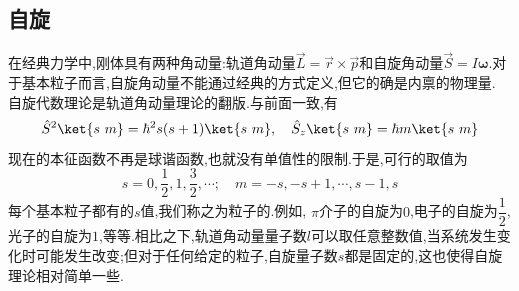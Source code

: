 \documentclass{ctexart}
\begin{document}
\subsection{自旋}
在经典力学中,刚体具有两种角动量:轨道角动量$\vec{L}=\vec{r}\times\vec{p}$和自旋角动量$\vec{S}=I\symbf\omega$.对于基本粒子而言,自旋角动量不能通过经典的方式定义,但它的确是内禀的物理量.\\
\indent 自旋代数理论是轨道角动量理论的翻版.与前面一致,有
\[\hat{S}^2\ket{s\ m}=\hbar^2s(s+1)\ket{s\ m},\quad\hat{S}_z\ket{s\ m}=\hbar m\ket{s\ m}\]
现在的本征函数不再是球谐函数,也就没有单值性的限制.于是,可行的取值为
\[s=0,\dfrac12,1,\dfrac32,\cdots;\quad m=-s,-s+1,\cdots,s-1,s\]
\indent 每个基本粒子都有的$s$值,我们称之为粒子的.例如, $\pi$介子的自旋为$0$,电子的自旋为$\dfrac12$,光子的自旋为$1$,等等.相比之下,轨道角动量量子数$l$可以取任意整数值,当系统发生变化时可能发生改变;但对于任何给定的粒子,自旋量子数$s$都是固定的,这也使得自旋理论相对简单一些.
\end{document}

